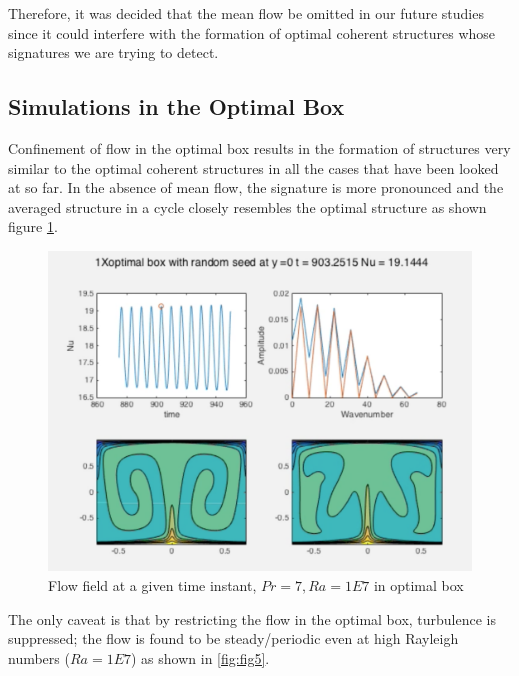 \documentclass[12pt]{article}
\begin{document}
     Therefore, it was decided that the mean flow be omitted in our future studies since it could interfere with the formation of optimal coherent structures whose signatures we are trying to detect.
     
      \subsection{Simulations in the Optimal Box}
      
      Confinement of flow in the optimal box results in the formation of structures very similar to the optimal coherent structures in all the cases that have been looked at so far. In the absence of mean flow, the signature is more pronounced and the averaged structure in a cycle closely resembles the optimal structure as shown figure \ref{fig:fig3}.
      
      \begin{figure}[!htb]
      	\includegraphics[width=\linewidth]{1E7opt.png}
      	\caption{Flow field at a given time instant, $Pr = 7, Ra = 1E7$ in optimal box}
      	\label{fig:fig3}
      \end{figure}
      
      
      The only caveat is that by restricting the flow in the optimal box, turbulence is suppressed; the flow is found to be steady/periodic even at high Rayleigh numbers ($Ra = 1E7$) as shown in \ref{fig:fig5}.
      
\end{document}
